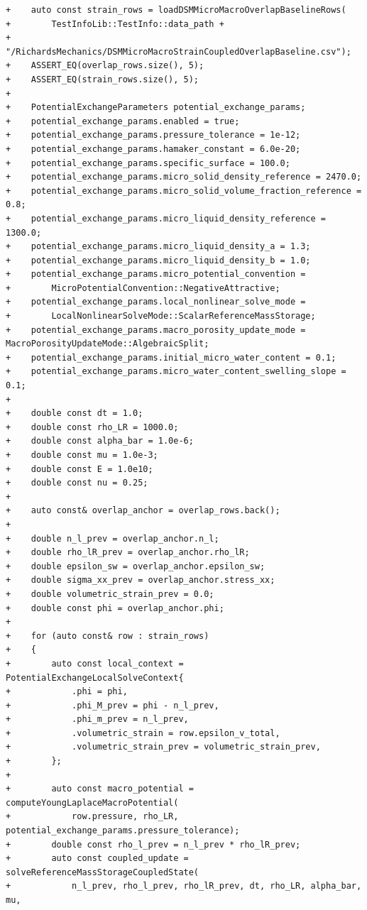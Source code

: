 \documentclass[10pt]{article}
\begin{document}
\begin{lstlisting}
+    auto const strain_rows = loadDSMMicroMacroOverlapBaselineRows(
+        TestInfoLib::TestInfo::data_path +
+        "/RichardsMechanics/DSMMicroMacroStrainCoupledOverlapBaseline.csv");
+    ASSERT_EQ(overlap_rows.size(), 5);
+    ASSERT_EQ(strain_rows.size(), 5);
+
+    PotentialExchangeParameters potential_exchange_params;
+    potential_exchange_params.enabled = true;
+    potential_exchange_params.pressure_tolerance = 1e-12;
+    potential_exchange_params.hamaker_constant = 6.0e-20;
+    potential_exchange_params.specific_surface = 100.0;
+    potential_exchange_params.micro_solid_density_reference = 2470.0;
+    potential_exchange_params.micro_solid_volume_fraction_reference = 0.8;
+    potential_exchange_params.micro_liquid_density_reference = 1300.0;
+    potential_exchange_params.micro_liquid_density_a = 1.3;
+    potential_exchange_params.micro_liquid_density_b = 1.0;
+    potential_exchange_params.micro_potential_convention =
+        MicroPotentialConvention::NegativeAttractive;
+    potential_exchange_params.local_nonlinear_solve_mode =
+        LocalNonlinearSolveMode::ScalarReferenceMassStorage;
+    potential_exchange_params.macro_porosity_update_mode = MacroPorosityUpdateMode::AlgebraicSplit;
+    potential_exchange_params.initial_micro_water_content = 0.1;
+    potential_exchange_params.micro_water_content_swelling_slope = 0.1;
+
+    double const dt = 1.0;
+    double const rho_LR = 1000.0;
+    double const alpha_bar = 1.0e-6;
+    double const mu = 1.0e-3;
+    double const E = 1.0e10;
+    double const nu = 0.25;
+
+    auto const& overlap_anchor = overlap_rows.back();
+
+    double n_l_prev = overlap_anchor.n_l;
+    double rho_lR_prev = overlap_anchor.rho_lR;
+    double epsilon_sw = overlap_anchor.epsilon_sw;
+    double sigma_xx_prev = overlap_anchor.stress_xx;
+    double volumetric_strain_prev = 0.0;
+    double const phi = overlap_anchor.phi;
+
+    for (auto const& row : strain_rows)
+    {
+        auto const local_context = PotentialExchangeLocalSolveContext{
+            .phi = phi,
+            .phi_M_prev = phi - n_l_prev,
+            .phi_m_prev = n_l_prev,
+            .volumetric_strain = row.epsilon_v_total,
+            .volumetric_strain_prev = volumetric_strain_prev,
+        };
+
+        auto const macro_potential = computeYoungLaplaceMacroPotential(
+            row.pressure, rho_LR, potential_exchange_params.pressure_tolerance);
+        double const rho_l_prev = n_l_prev * rho_lR_prev;
+        auto const coupled_update = solveReferenceMassStorageCoupledState(
+            n_l_prev, rho_l_prev, rho_lR_prev, dt, rho_LR, alpha_bar, mu,

\end{lstlisting}
\end{document}
